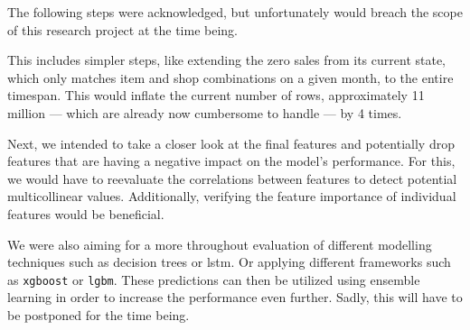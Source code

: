 The following steps were acknowledged, but unfortunately would breach the scope of this research project at the time being.

This includes simpler steps, like extending the zero sales from its current state, which only matches item and shop combinations on a given month, to the entire timespan.
This would inflate the current number of rows, approximately 11 million --- which are already now cumbersome to handle --- by 4 times.

Next, we intended to take a closer look at the final features and potentially drop features that are having a negative impact on the model's performance. For this, we would have to reevaluate the correlations between features to detect potential multicollinear values. Additionally, verifying the feature importance of individual features would be beneficial.

We were also aiming for a more throughout evaluation of different modelling techniques such as decision trees or \acrshort{lstm}. Or applying different frameworks such as \texttt{xgboost} or \texttt{\acrshort{lgbm}}.
These predictions can then be utilized using ensemble learning in order to increase the performance even further. Sadly, this will have to be postponed for the time being.

